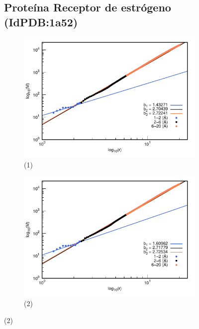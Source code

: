 \begin{figure}[H]
	\subsection*{Proteína Receptor de estr\'{o}geno (IdPDB:1a52)}
	
	\hspace{-0.3cm} 
	\begin{subfigure}{0.49\textwidth}
		\centering
		\includegraphics[width=\linewidth,page=1]{graphs/PDBs/1a52/1a52addH.pdf}
		\caption{(1)}
	\end{subfigure}
	\hspace{0.2cm}
	\begin{subfigure}{0.49\textwidth}
		\centering
		\includegraphics[width=\linewidth,page=1]{graphs/PDBs/1a52/1a52Em.pdf}
		\caption{(2)}
	\end{subfigure}
	

\end{figure}
